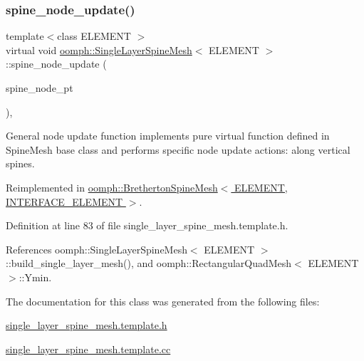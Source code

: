 \mbox{\label{classoomph_1_1SingleLayerSpineMesh_a364648c15ab29c0c8d1cf7c2bc4cb792}} 
\subsubsection{\texorpdfstring{spine\+\_\+node\+\_\+update()}{spine\_node\_update()}}
{\footnotesize\ttfamily template$<$class E\+L\+E\+M\+E\+NT $>$ \\
virtual void \hyperlink{classoomph_1_1SingleLayerSpineMesh}{oomph\+::\+Single\+Layer\+Spine\+Mesh}$<$ E\+L\+E\+M\+E\+NT $>$\+::spine\+\_\+node\+\_\+update (\begin{DoxyParamCaption}\item[{Spine\+Node $\ast$}]{spine\+\_\+node\+\_\+pt }\end{DoxyParamCaption})\hspace{0.3cm}{\ttfamily [inline]}, {\ttfamily [virtual]}}



General node update function implements pure virtual function defined in Spine\+Mesh base class and performs specific node update actions\+: along vertical spines. 



Reimplemented in \hyperlink{classoomph_1_1BrethertonSpineMesh_a981301706d4940cfb24d3d769a7a523b}{oomph\+::\+Bretherton\+Spine\+Mesh$<$ E\+L\+E\+M\+E\+N\+T, I\+N\+T\+E\+R\+F\+A\+C\+E\+\_\+\+E\+L\+E\+M\+E\+N\+T $>$}.



Definition at line 83 of file single\+\_\+layer\+\_\+spine\+\_\+mesh.\+template.\+h.



References oomph\+::\+Single\+Layer\+Spine\+Mesh$<$ E\+L\+E\+M\+E\+N\+T $>$\+::build\+\_\+single\+\_\+layer\+\_\+mesh(), and oomph\+::\+Rectangular\+Quad\+Mesh$<$ E\+L\+E\+M\+E\+N\+T $>$\+::\+Ymin.



The documentation for this class was generated from the following files\+:\begin{DoxyCompactItemize}
\item 
\hyperlink{single__layer__spine__mesh_8template_8h}{single\+\_\+layer\+\_\+spine\+\_\+mesh.\+template.\+h}\item 
\hyperlink{single__layer__spine__mesh_8template_8cc}{single\+\_\+layer\+\_\+spine\+\_\+mesh.\+template.\+cc}\end{DoxyCompactItemize}
